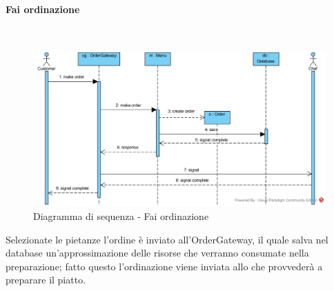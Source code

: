 \begin{samepage}
\paragraph{Fai ordinazione}\mbox{}\\
\end{samepage}
\begin{figure}[H]
	\centering
	\includegraphics[width=14cm]{../../documenti/SpecificaTecnica/diagrammi_img/sequenza/cliente_fai_ordinazione.png}
	\caption{Diagramma di sequenza - Fai ordinazione}
\end{figure}
Selezionate le pietanze l'ordine è inviato all'Order\-Gateway, il quale salva nel database un'approssimazione delle risorse che verranno consumate nella preparazione; fatto questo l'ordinazione viene inviata allo \Chef{} che provvederà a preparare il piatto.

\subsubsection{\Chef{}}

